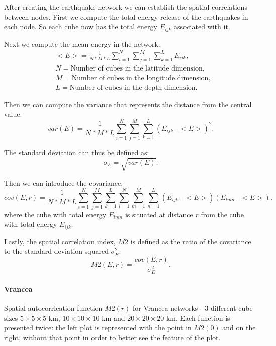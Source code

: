 After creating the earthquake network we can establish the spatial correlations between nodes. First we compute the total energy release of the earthquakes in each node. So each cube now has the total energy $E_{ijk}$ associated with it.\par
Next we compute the mean energy in the network:
\begin{equation}
\begin{split}
&<E> = \frac{1}{N*M*L}\sum_{i=1}^{N}\sum_{j=1}^{M}\sum_{k=1}^{L} E_{ijk},\\
&N = \text{Number of cubes in the latitude dimension},\\
&M = \text{Number of cubes in the longitude dimension},\\
&L = \text{Number of cubes in the depth dimension}.
\end{split}
\end{equation}

Then we can compute the variance that represents the distance from the central value:
\begin{equation}
var(E) = \frac{1}{N*M*L}\sum_{i=1}^{N}\sum_{j=1}^{M}\sum_{k=1}^{L} (E_{ijk} -<E>)^2.
\end{equation}

The standard deviation can thus be defined as:
\begin{equation}
\sigma_E = \sqrt{var(E)}.
\end{equation}

Then we can introduce the covariance:
\begin{equation}
cov(E,r) = \frac{1}{N*M*L}\sum_{i=1}^{N}\sum_{j=1}^{M}\sum_{k=1}^{L} \sum_{l=1}^{N}\sum_{m=1}^{M}\sum_{n=1}^{L} (E_{ijk} -<E>)(E_{lmn} -<E>).
\end{equation}
where the cube with total energy $E_{lmn}$ is situated at distance $r$ from the cube with total energy $E_{ijk}$.

Lastly, the spatial correlation index, $M2$ is defined as the ratio of the covariance to the standard deviation squared $\sigma_{E}^2$:
\begin{equation}
M2(E,r) = \frac{cov(E,r)}{\sigma^2_E}.
\end{equation}


\paragraph{Vrancea} Spatial autocorrleation function $M2(r)$ for Vrancea networks - 3 different cube sizes $5\times5\times5$ km, $10\times10\times10$ km and $20\times20\times20$ km. Each function is presented twice: the left plot is represented with the point in $M2(0)$ and on the right, without that point in order to better see the feature of the plot.




